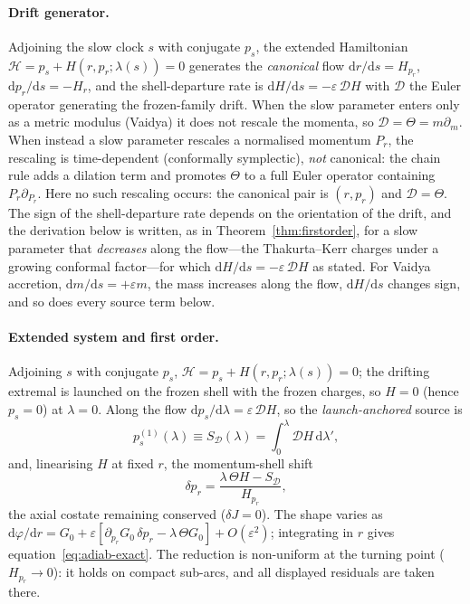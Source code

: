 \documentclass[12pt]{iopart}
\newcommand{\dd}{\mathrm{d}}
\theoremstyle{plain}
\theoremstyle{definition}
\theoremstyle{plain}
\theoremstyle{remark}
\begin{document}
\paragraph{Drift generator.} Adjoining the slow clock $s$ with conjugate $p_s$, the
extended Hamiltonian $\mathcal H=p_s+H(r,p_r;\lambda(s))=0$ generates the \emph{canonical}
flow $\dd r/\dd s=H_{p_r}$, $\dd p_r/\dd s=-H_r$, and the shell-departure rate is
$\dd H/\dd s=-\varepsilon\,\mathcal D H$ with $\mathcal D$ the Euler operator generating
the frozen-family drift. When the slow parameter enters only as a metric modulus
(Vaidya) it does not rescale the momenta, so $\mathcal D=\Theta=m\partial_m$. When
instead a slow parameter rescales a normalised momentum $P_r$, the rescaling is
time-dependent (conformally symplectic), \emph{not} canonical: the chain rule adds a
dilation term and promotes $\Theta$ to a full Euler operator containing
$P_r\partial_{P_r}$. Here no such rescaling occurs: the canonical pair is $(r,p_r)$ and
$\mathcal D=\Theta$. The sign of the shell-departure rate depends on the orientation of the
drift, and the derivation below is written, as in Theorem~\ref{thm:firstorder}, for a slow
parameter that \emph{decreases} along the flow---the Thakurta--Kerr charges under a growing
conformal factor---for which $\dd H/\dd s=-\varepsilon\,\mathcal DH$ as stated. For Vaidya
accretion, $\dd m/\dd s=+\varepsilon m$, the mass increases along the flow, $\dd H/\dd s$
changes sign, and so does every source term below.

\paragraph{Extended system and first order.} Adjoining $s$ with conjugate $p_s$,
$\mathcal H=p_s+H(r,p_r;\lambda(s))=0$; the drifting extremal is launched on the frozen
shell with the frozen charges, so $H=0$ (hence $p_s=0$) at $\lambda=0$. Along the flow
$\dd p_s/\dd\lambda=\varepsilon\,\mathcal D H$, so the \emph{launch-anchored} source is
\begin{equation}
    p_s^{(1)}(\lambda)\equiv S_{\mathcal D}(\lambda)
    =\int_0^{\lambda}\mathcal D H\,\dd\lambda',
    \label{eq:pS-app}
\end{equation}
and, linearising $H$ at fixed $r$, the momentum-shell shift
\begin{equation}
    \delta p_r=\frac{\lambda\,\Theta H-S_{\mathcal D}}{H_{p_r}},
    \label{eq:dpr-app}
\end{equation}
the axial costate remaining conserved ($\delta J=0$). The shape varies as
$\dd\varphi/\dd r=G_0+\varepsilon[\partial_{p_r}G_0\,\delta p_r-\lambda\,\Theta G_0]
+O(\varepsilon^2)$; integrating in $r$ gives equation~\eqref{eq:adiab-exact}. The reduction is
non-uniform at the turning point ($H_{p_r}\to0$): it holds on compact sub-arcs, and all
displayed residuals are taken there.
\end{document}
